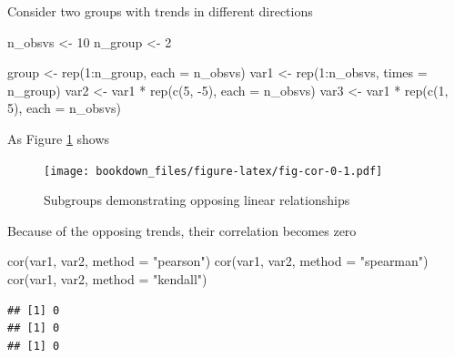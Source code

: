 \documentclass[
]{krantz}
\makeatletter
\newenvironment{Shaded}{\begin{snugshade}}{\end{snugshade}}
\newcommand{\AttributeTok}[1]{\textcolor[rgb]{0.61,0.61,0.61}{#1}}
\newcommand{\DecValTok}[1]{\textcolor[rgb]{0.06,0.06,0.06}{#1}}
\newcommand{\FunctionTok}[1]{\textcolor[rgb]{0,0,0}{#1}}
\newcommand{\NormalTok}[1]{#1}
\newcommand{\OtherTok}[1]{\textcolor[rgb]{0.37,0.37,0.37}{#1}}
\newcommand{\SpecialCharTok}[1]{\textcolor[rgb]{0,0,0}{#1}}
\newcommand{\StringTok}[1]{\textcolor[rgb]{0.5,0.5,0.5}{#1}}
\newenvironment{kframe}{%
\medskip{}
\setlength{\fboxsep}{.8em}
 \def\at@end@of@kframe{}%
 \ifinner\ifhmode%
  \def\at@end@of@kframe{\end{minipage}}%
  \begin{minipage}{\columnwidth}%
 \fi\fi%
 \def\FrameCommand##1{\hskip\@totalleftmargin \hskip-\fboxsep
 \colorbox{shadecolor}{##1}\hskip-\fboxsep
     \hskip-\linewidth \hskip-\@totalleftmargin \hskip\columnwidth}%
 \MakeFramed {\advance\hsize-\width
   \@totalleftmargin\z@ \linewidth\hsize
   \@setminipage}}%
 {\par\unskip\endMakeFramed%
 \at@end@of@kframe}
\renewenvironment{Shaded}{\begin{kframe}}{\end{kframe}}
\makeatother
\begin{document}
Consider two groups with trends in different directions

\begin{Shaded}
\begin{Highlighting}[]
\NormalTok{n\_obsvs }\OtherTok{\textless{}{-}} \DecValTok{10}
\NormalTok{n\_group }\OtherTok{\textless{}{-}}  \DecValTok{2}

\NormalTok{group }\OtherTok{\textless{}{-}} \FunctionTok{rep}\NormalTok{(}\DecValTok{1}\SpecialCharTok{:}\NormalTok{n\_group, }\AttributeTok{each =}\NormalTok{ n\_obsvs)}
\NormalTok{var1  }\OtherTok{\textless{}{-}} \FunctionTok{rep}\NormalTok{(}\DecValTok{1}\SpecialCharTok{:}\NormalTok{n\_obsvs, }\AttributeTok{times =}\NormalTok{ n\_group)}
\NormalTok{var2  }\OtherTok{\textless{}{-}}\NormalTok{ var1 }\SpecialCharTok{*} \FunctionTok{rep}\NormalTok{(}\FunctionTok{c}\NormalTok{(}\DecValTok{5}\NormalTok{, }\SpecialCharTok{{-}}\DecValTok{5}\NormalTok{), }\AttributeTok{each =}\NormalTok{ n\_obsvs)}
\NormalTok{var3  }\OtherTok{\textless{}{-}}\NormalTok{ var1 }\SpecialCharTok{*} \FunctionTok{rep}\NormalTok{(}\FunctionTok{c}\NormalTok{(}\DecValTok{1}\NormalTok{,  }\DecValTok{5}\NormalTok{), }\AttributeTok{each =}\NormalTok{ n\_obsvs)}
\end{Highlighting}
\end{Shaded}

As Figure \ref{fig:fig-cor-0} shows

\begin{figure}
\centering
\texttt{[image: bookdown\_files/figure-latex/fig-cor-0-1.pdf]}
\caption{\label{fig:fig-cor-0}Subgroups demonstrating opposing linear relationships}
\end{figure}

Because of the opposing trends, their correlation becomes zero

\begin{Shaded}
\begin{Highlighting}[]
\FunctionTok{cor}\NormalTok{(var1, var2, }\AttributeTok{method =} \StringTok{"pearson"}\NormalTok{)}
\FunctionTok{cor}\NormalTok{(var1, var2, }\AttributeTok{method =} \StringTok{"spearman"}\NormalTok{)}
\FunctionTok{cor}\NormalTok{(var1, var2, }\AttributeTok{method =} \StringTok{"kendall"}\NormalTok{)}
\end{Highlighting}
\end{Shaded}

\begin{verbatim}
## [1] 0
## [1] 0
## [1] 0
\end{verbatim}
\end{document}
